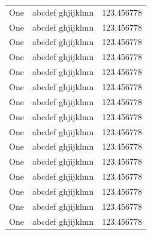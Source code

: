\begin{center}
\begin{supertabular}[c]{|l|l|l|}
One & abcdef ghjijklmn & 123.456778 \\
One & abcdef ghjijklmn & 123.456778 \\
One & abcdef ghjijklmn & 123.456778 \\
One & abcdef ghjijklmn & 123.456778 \\
One & abcdef ghjijklmn & 123.456778 \\
One & abcdef ghjijklmn & 123.456778 \\
One & abcdef ghjijklmn & 123.456778 \\
One & abcdef ghjijklmn & 123.456778 \\
One & abcdef ghjijklmn & 123.456778 \\
One & abcdef ghjijklmn & 123.456778 \\
One & abcdef ghjijklmn & 123.456778 \\
One & abcdef ghjijklmn & 123.456778 \\
One & abcdef ghjijklmn & 123.456778 \\
One & abcdef ghjijklmn & 123.456778 \\
One & abcdef ghjijklmn & 123.456778 \\
\end{supertabular}
\end{center}

